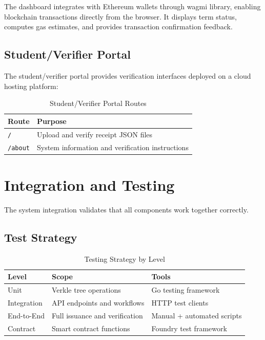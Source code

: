 The dashboard integrates with Ethereum wallets through wagmi library, enabling blockchain transactions directly from the browser. It displays term status, computes gas estimates, and provides transaction confirmation feedback.

\subsection{Student/Verifier Portal}
\label{subsec:student-portal}

The student/verifier portal provides verification interfaces deployed on a cloud hosting platform:

\begin{table}[H]
\centering
\caption{Student/Verifier Portal Routes}
\label{tab:portal-routes}
\begin{tabular}{|p{3.5cm}|p{9.5cm}|}
\hline
\textbf{Route} & \textbf{Purpose} \\
\hline
\texttt{/} & Upload and verify receipt JSON files \\
\hline
\texttt{/about} & System information and verification instructions \\
\hline
\end{tabular}
\end{table}

\section{Integration and Testing}
\label{sec:integration-testing}

The system integration validates that all components work together correctly.

\subsection{Test Strategy}
\label{subsec:test-strategy}

\begin{table}[H]
\centering
\caption{Testing Strategy by Level}
\label{tab:test-strategy}
\begin{tabular}{|p{3.5cm}|p{5cm}|p{4.5cm}|}
\hline
\textbf{Level} & \textbf{Scope} & \textbf{Tools} \\
\hline
Unit & Verkle tree operations & Go testing framework \\
\hline
Integration & API endpoints and workflows & HTTP test clients \\
\hline
End-to-End & Full issuance and verification & Manual + automated scripts \\
\hline
Contract & Smart contract functions & Foundry test framework \\
\hline
\end{tabular}
\end{table}

